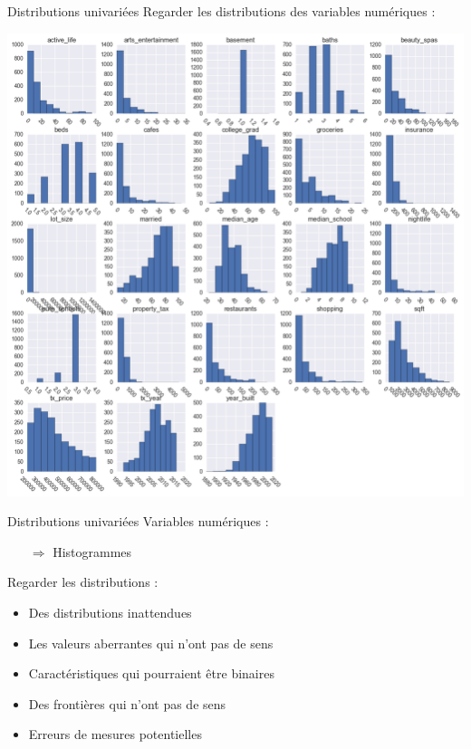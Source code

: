 \documentclass[french]{beamer}
\begin{document}
\begin{frame}{Distributions univariées}
Regarder les distributions des variables numériques : 
\begin{center}
	\includegraphics[height=0.8\textheight]{univariate}
\end{center}
\end{frame}

\begin{frame}{Distributions univariées}
Variables numériques : 
\begin{itemize}
	\item[$\Rightarrow$] Histogrammes
\end{itemize}

Regarder les distributions : 
\begin{itemize}
	\item Des distributions inattendues
	\item Les valeurs aberrantes qui n'ont pas de sens
	\item Caractéristiques qui pourraient être binaires
	\item Des frontières qui n'ont pas de sens
	\item Erreurs de mesures potentielles	
\end{itemize}
\end{frame}
\end{document}
